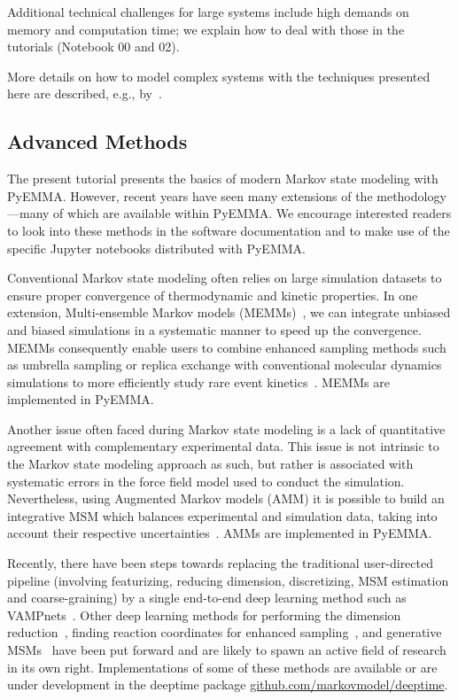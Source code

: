 \documentclass[9pt,tutorial]{livecoms}
\begin{document}
Additional technical challenges for large systems include high demands on memory and computation time;
we explain how to deal with those in the tutorials (Notebook 00 and 02).

More details on how to model complex systems with the techniques presented here are described, e.g., by~\cite{plattner_protein_2015,plattner_complete_2017}.

\subsection{Advanced Methods}

The present tutorial presents the basics of modern Markov state modeling with PyEMMA. 
However, recent years have seen many extensions of the methodology---many of which are available within PyEMMA. 
We encourage interested readers to look into these methods in the software documentation and to make use of the specific Jupyter notebooks distributed with PyEMMA.

Conventional Markov state modeling often relies on large simulation datasets to ensure proper convergence of thermodynamic and kinetic properties. 
In one extension, Multi-ensemble Markov models (MEMMs)~\cite{dtram,tram},
we can integrate unbiased and biased simulations in a systematic manner to speed up the convergence. 
MEMMs consequently enable users to combine enhanced sampling methods such as umbrella sampling or replica exchange
with conventional molecular dynamics simulations to more efficiently study rare event kinetics~\cite{trammbar}. 
MEMMs are implemented in PyEMMA.

Another issue often faced during Markov state modeling is a lack of quantitative agreement with complementary experimental data. 
This issue is not intrinsic to the Markov state modeling approach as such,
but rather is associated with systematic errors in the force field model used to conduct the simulation. 
Nevertheless, using Augmented Markov models (AMM) it is possible to build an integrative MSM which balances experimental and simulation data,
taking into account their respective uncertainties~\cite{simon-amm}. 
AMMs are implemented in PyEMMA.  

Recently, there have been steps towards replacing the traditional user-directed pipeline (involving featurizing,
reducing dimension, discretizing, MSM estimation and coarse-graining) by a single end-to-end deep learning method such as VAMPnets~\cite{vampnet}.
Other deep learning methods for performing the dimension reduction~\cite{tae},
finding reaction coordinates for enhanced sampling~\cite{hernandez-vde,Sultan2018-vde-enhanced-sampling,Ribeiro2018-rave},
and generative MSMs~\cite{deep-gen-msm-preprint} have been put forward and are likely to spawn an active field of research in its own right.
Implementations of some of these methods are available or are under development in the deeptime package \url{github.com/markovmodel/deeptime}. 
\end{document}
